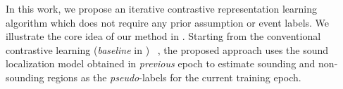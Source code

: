 In this work, we propose an iterative contrastive representation learning algorithm which does not require any prior assumption or event labels.
%
We illustrate the core idea of our method in .
%
Starting from the conventional contrastive learning (\textit{baseline} in )~\cite{av_iccv17_look,av_eccv18_obj_that_sound,av_nips16_soundnet,av_eccv16_abSound} 
, the proposed approach uses the sound localization model obtained in \emph{previous} epoch to estimate sounding and non-sounding regions as the \emph{pseudo}-labels for the current training epoch.
